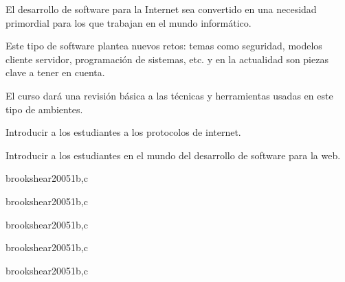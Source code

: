 \begin{syllabus}


\begin{justification}
El desarrollo de software para la Internet sea convertido en una necesidad primordial para los que trabajan en el mundo informático.

Este tipo de software plantea nuevos retos: temas como seguridad, modelos cliente servidor, programación de sistemas, etc. y en la actualidad son piezas clave a tener en cuenta.

El curso dará una revisión básica a las técnicas y herramientas usadas en este tipo de ambientes.
\end{justification}

\begin{goals}
\item Introducir a los estudiantes a los protocolos de internet.
\item Introducir a los estudiantes en el mundo del desarrollo de software para la web.
\end{goals}

\begin{outcomes}
\end{outcomes}

\begin{unit}{\NCIntroductionDef}{brookshear2005}{1}{b,c}
   \NCIntroductionAllTopics
   \NCIntroductionAllObjectives
\end{unit}

\begin{unit}{\NCNetworkCommunicationDef}{brookshear2005}{1}{b,c}
   \NCNetworkCommunicationAllTopics
   \NCNetworkCommunicationAllObjectives
\end{unit}

\begin{unit}{\NCNetworkSecurityDef}{brookshear2005}{1}{b,c}
   \NCNetworkSecurityAllTopics
   \NCNetworkSecurityAllObjectives
\end{unit}

\begin{unit}{\NCCompressionDef}{brookshear2005}{1}{b,c}
   \NCCompressionAllTopics
   \NCCompressionAllObjectives
\end{unit}

\begin{unit}{\NCNetworkManagementDef}{brookshear2005}{1}{b,c}
   \NCNetworkManagementAllTopics
   \NCNetworkManagementAllObjectives
\end{unit}


\end{syllabus}
